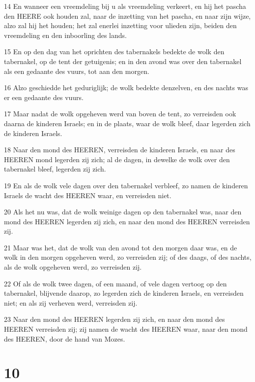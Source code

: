 \par 14 En wanneer een vreemdeling bij u als vreemdeling verkeert, en hij het pascha den HEERE ook houden zal, naar de inzetting van het pascha, en naar zijn wijze, alzo zal hij het houden; het zal enerlei inzetting voor ulieden zijn, beiden den vreemdeling en den inboorling des lands.
\par 15 En op den dag van het oprichten des tabernakels bedekte de wolk den tabernakel, op de tent der getuigenis; en in den avond was over den tabernakel als een gedaante des vuurs, tot aan den morgen.
\par 16 Alzo geschiedde het geduriglijk; de wolk bedekte denzelven, en des nachts was er een gedaante des vuurs.
\par 17 Maar nadat de wolk opgeheven werd van boven de tent, zo verreisden ook daarna de kinderen Israels; en in de plaats, waar de wolk bleef, daar legerden zich de kinderen Israels.
\par 18 Naar den mond des HEEREN, verreisden de kinderen Israels, en naar des HEEREN mond legerden zij zich; al de dagen, in dewelke de wolk over den tabernakel bleef, legerden zij zich.
\par 19 En als de wolk vele dagen over den tabernakel verbleef, zo namen de kinderen Israels de wacht des HEEREN waar, en verreisden niet.
\par 20 Als het nu was, dat de wolk weinige dagen op den tabernakel was, naar den mond des HEEREN legerden zij zich, en naar den mond des HEEREN verreisden zij.
\par 21 Maar was het, dat de wolk van den avond tot den morgen daar was, en de wolk in den morgen opgeheven werd, zo verreisden zij; of des daags, of des nachts, als de wolk opgeheven werd, zo verreisden zij.
\par 22 Of als de wolk twee dagen, of een maand, of vele dagen vertoog op den tabernakel, blijvende daarop, zo legerden zich de kinderen Israels, en verreisden niet; en als zij verheven werd, verreisden zij.
\par 23 Naar den mond des HEEREN legerden zij zich, en naar den mond des HEEREN verreisden zij; zij namen de wacht des HEEREN waar, naar den mond des HEEREN, door de hand van Mozes.

\chapter{10}

